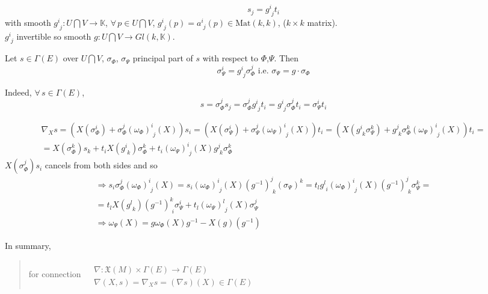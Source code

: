 \documentclass[10pt]{amsart}
\begin{document}
\begin{multicols*}{2}
\[
s_j = g^i_{ \,\, j} t_i 
\]
with smooth $g^i_{ \,\, j} : U \bigcap V \to \mathbb{K}$, $\forall \, p \in U \bigcap V$, $g^i_{ \,\, j}(p) = a^i_{ \, \, j}(p) \in \text{Mat}(k,k)$, ($k\times k$ matrix).  \\
\phantom{ with } $g^i_{ \,\, j}$ invertible so smooth $g:U\bigcap V \to Gl(k,\mathbb{K})$.

Let $s\in \Gamma(E)$ over $U\bigcap V$, $\sigma_{\Phi}$, $\sigma_{\Psi}$ principal part of $s$ with respect to $\Phi$,$\Psi$.  Then
\[
\sigma^i_{\Psi} = g^i_{ \,\, j} \sigma^j_{\Phi} \text{ i.e. } \sigma_{\Psi} = g\cdot \sigma_{\Phi}
\]

Indeed, $\forall \, s \in \Gamma(E)$,
\[
s = \sigma^j_{\Phi} s_j = \sigma^j_{\Phi} g^i_{ \,\, j} t_i = g^i_{ \,\, j} \sigma^j_{ \Phi } t_i = \sigma^i_{\Psi } t_i
\]





\[
\begin{gathered}
  \nabla_X s = (X(\sigma^i_{\Phi})+\sigma^j_{\Phi}(\omega_{\Phi})^i_{ \,\, j}(X) ) s_i = (X(\sigma^i_{\Psi}) + \sigma^j_{\Psi} (\omega_{\Psi})^i_{ \, \, j}(X) )t_i = (X(g^i_{ \,\, k} \sigma^k_{\Psi} ) + g^j_{ \,\,k} \sigma_{\Phi}^k (\omega_{\Psi})^i_{ \,\, j}(X))t_i = \\
  = X(\sigma^k_{\Phi})s_k + t_i X(g^i_{ \,\, k} ) \sigma^k_{\Phi} + t_i (\omega_{\Psi})^i_{ \,\, j}(X) g^j_{ \,\, k} \sigma^k_{\Phi} 
\end{gathered}
\]
$X(\sigma^j_{\Phi})s_i$ cancels from both sides and so
\[
\begin{gathered}
  \Longrightarrow s_i \sigma^j_{\Phi} (\omega_{\Phi})^i_{ \,\, j}(X) = s_i (\omega_{\Phi})^i_{ \,\, j}(X) (g^{-1})^j_{ \,\, k} (\sigma_{\Psi})^k = t_l g^l_{\,\, i} (\omega_{\Phi})^i_{ \,\, j}(X) (g^{-1})^j_{\,\,k} \sigma^k_{\Psi} = \\
  = t_l X(g^l_{ \,\, k})(g^{-1})^k_{ \,\, i} \sigma^i_{\Psi} + t_l (\omega_{\Psi})^l_{ \,\, j}(X) \sigma^j_{\Psi}  \\
  \Longrightarrow \omega_{\Psi}(X) = g\omega_{\Phi}(X)g^{-1} - X(g)(g^{-1})
\end{gathered}
\]

In summary, 
\begin{quote}
for connection $\begin{aligned} & \quad \\
  & \nabla : \mathfrak{X}(M) \times \Gamma(E) \to \Gamma(E) \\
  & \nabla(X,s) = \nabla_Xs = (\nabla s)(X) \in \Gamma(E) \end{aligned}$


\end{quote}
\end{multicols*}
\end{document}
